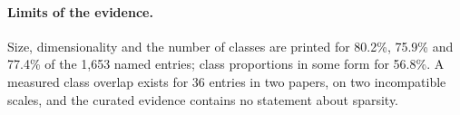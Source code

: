 \paragraph{Limits of the evidence.}
Size, dimensionality and the number of classes are printed for 80.2\%, 75.9\% and 77.4\% of the
1,653 named entries; class proportions in some form for 56.8\%.
A measured class overlap exists for 36 entries in two papers, on two
incompatible scales, and the curated evidence contains no statement about sparsity.

